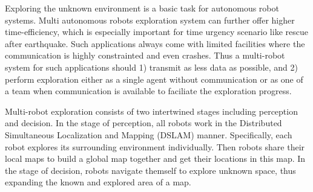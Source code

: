 Exploring the unknown environment is a basic task for autonomous robot systems.
Multi autonomous robots exploration system can further offer higher time-efficiency, which is especially important for time urgency scenario like rescue after earthquake. Such applications always come with limited facilities where the communication is highly constrainted and even crashes. Thus a multi-robot system for such applications should 1) transmit as less data as possible, and 2) perform exploration either as a single agent without communication or as one of a team when communication is available to faciliate the exploration progress.  



Multi-robot exploration consists of two intertwined stages including perception and decision.
In the stage of perception, all robots work in the Distributed Simultaneous Localization and Mapping (DSLAM) manner. Specifically, each robot explores its surrounding environment individually. Then robots share their local maps to build a global map together and get their locations in this map.
In the stage of decision, robots navigate themself to explore unknown space, thus expanding the known and explored area of a map.%

